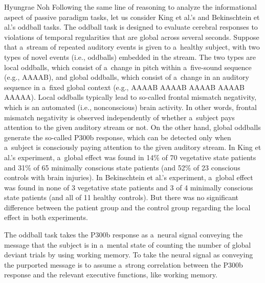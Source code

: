 \begin{artengenv}{Hyungrae Noh}
Following the same line of reasoning to analyze the informational aspect of passive paradigm tasks, let us consider King et al.'s
\parencite*[][]{king_single-trial_2013} %
 and Bekinschtein et al.'s 
\parencite*[][]{bekinschtein_neural_2009} %
 oddball tasks. The oddball task is designed to evaluate cerebral responses to violations of temporal regularities that are global across several seconds. Suppose that a~stream of repeated auditory events is given to a~healthy subject, with two types of novel events (i.e., oddballs) embedded in the stream. The two types are local oddballs, which consist of a~change in pitch within a~five-sound sequence (e.g., AAAAB), and global oddballs, which consist of a~change in an auditory sequence in a~fixed global context (e.g., AAAAB AAAAB AAAAB AAAAB AAAAA). Local oddballs typically lead to so-called frontal mismatch negativity, which is an automated (i.e., nonconscious) brain activity. In other words, frontal mismatch negativity is observed independently of whether a~subject pays attention to the given auditory stream or not. On the other hand, global oddballs generate the so-called P300b response, which can be detected only when a~subject is consciously paying attention to the given auditory stream. In King et al.'s 
\parencite*[][]{king_single-trial_2013} %
 experiment, a~global effect was found in 14\% of 70 vegetative state patients and 31\% of 65 minimally conscious state patients (and 52\% of 23 conscious controls with brain injuries). In Bekinschtein et al.'s 
\parencite*[][]{bekinschtein_neural_2009} %
 experiment, a~global effect was found in none of 3 vegetative state patients and 3 of 4 minimally conscious state patients (and all of 11 healthy controls). But there was no significant difference between the patient group and the control group regarding the local effect in both experiments.

The oddball task takes the P300b response as a~neural signal conveying the message that the subject is in a~mental state of counting the number of global deviant trials by using working memory. To take the neural signal as conveying the purported message is to assume a~strong correlation between the P300b response and the relevant executive functions, like working memory.


\end{artengenv}
